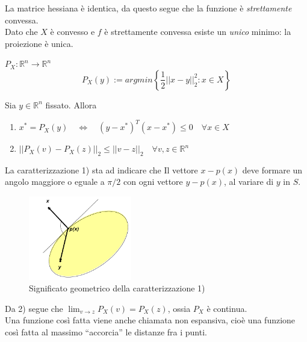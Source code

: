 La matrice hessiana \`e identica, da questo segue che la
funzione \`e \emph{strettamente} convessa.\\
Dato che $X$ è convesso e $f$ è strettamente convessa esiste un \emph{unico}
minimo: la proiezione \`e unica.

\begin{defn}[Proiezione di $y$ su X]
  $P_{X} : \mathbb{R}^{n} \rightarrow \mathbb{R}^{n}$
  $$P_{X}(y):= argmin \left\{ \dfrac{1}{2} ||x-y||_{2}^{2} : x \in X \right\}$$
\end{defn}

\begin{theo}
  \label{ottvinc:050}
  Sia $y \in \mathbb{R}^{n}$ fissato. Allora
  \begin{enumerate}
  \item $x^{*} = P_{X}(y) \quad
    \Longleftrightarrow \quad
    (y - x^{*})^{T} (x - x^{*}) \leq 0 \quad \forall x \in X$
  \item
    $ ||  P_{X}(v) - P_{X}(z)||_{2} \leq ||v-z||_{2} \quad \forall v, z \in \mathbb{R}^{n}$\\
  \end{enumerate}
\end{theo}

\begin{observation}
La caratterizzazione 1) sta ad indicare che
 Il vettore $x - p(x)$ deve formare un angolo maggiore o eguale a $\pi/2$ con ogni vettore
$y - p(x)$, al variare di $y$ in $S$.
\end{observation}
\begin{figure}[h!]
 \centering
 \includegraphics[width=0.4\textwidth]{./imgs/ottvinc09.png}
 \caption{Significato geometrico della caratterizzazione 1)}
\end{figure}

\begin{observation}
  Da 2) segue che $\lim_{v \to z} P_{X}(v) = P_{X}(z)$, ossia $P_{X}$
  \`e continua.\\ 
  Una funzione così fatta viene anche chiamata non espansiva, cioè una
  funzione così fatta al massimo ``accorcia'' le distanze fra i punti.
\end{observation}

